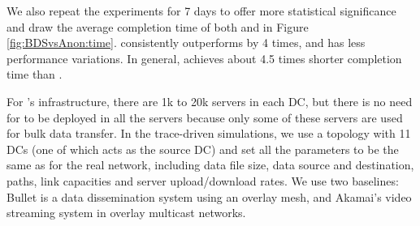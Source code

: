 We also repeat the experiments for 7 days to offer more statistical significance and draw the average completion time of both \name and \alg in Figure \ref{fig:BDSvsAnon:time}. \name consistently outperforms \alg by 4 times, and has less performance variations.
In general, \name achieves about 4.5 times shorter completion time than \alg.



For \company's infrastructure, there are 1k to 20k servers in each DC, but there is no need for \name to be deployed in all the servers because only some of these servers are used for bulk data transfer. In the trace-driven simulations, we use a topology with 11 DCs (one of which acts as the source DC) and set all the parameters to be the same as for the real network, including data file size, data source and destination, paths, link capacities and server upload/download rates. We use two baselines: Bullet \cite{kostic2003bullet} is a data dissemination system using an overlay mesh, and Akamai's video streaming system \cite{Andreev2013Designing} in overlay multicast networks.

